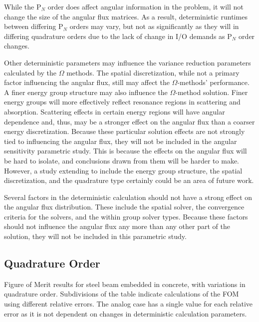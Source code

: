 While the P$_N$ order
does affect angular information in the problem, it will not change the size of
the angular flux matrices. As a result, deterministic runtimes between
differing P$_N$ orders
may vary, but not as significantly as they will in differing quadrature orders
due to the lack of change in I/O demands as P$_N$ order changes.

Other deterministic parameters may influence the variance reduction parameters
calculated by the $\Omega$ methods.
The spatial discretization, while not a primary factor influencing
the angular flux, still may affect the $\Omega$-methods' performance.
A finer energy group structure may also influence the $\Omega$-method solution.
Finer energy groups will more effectively reflect resonance regions in
scattering and absorption. Scattering effects in certain energy regions will
have angular dependence and, thus, may be a stronger effect on the angular flux
than a coarser energy discretization. Because these particular solution effects
are not strongly tied to influencing the angular flux, they will not be included
in the angular sensitivity parametric study. This is because the effects on the
angular flux will be hard to isolate, and conclusions drawn
from them will be harder to make. However, a study extending to include the
energy group structure, the spatial discretization, and the quadrature type
certainly could be an area of future work.

Several factors in the deterministic calculation should not have a strong effect
on the angular flux distribution. These include the spatial solver, the
convergence criteria for the solvers, and the within group solver types.
Because these factors should not influence the angular flux any more than any
other part of the solution, they will not be included in this parametric study.

\subsection{Quadrature Order}
\label{subsec:quadorder}

\begin{table}[h!]
  \centering
  
  \caption[Figure of Merit results for steel beam embedded in concrete, with
  variations in quadrature order.]{Figure of Merit results for steel beam embedded in concrete, with
  variations in quadrature order. Subdivisions of the table indicate
calculations of the FOM using different relative errors. The analog case has a
single value for each relative error as it is not dependent on changes in
deterministic calculation parameters.}
  \label{tab:quad_foms}
\end{table}

